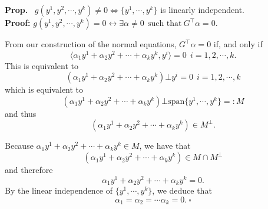 \documentclass[letterpaper]{article}
\begin{document}
%

\newpage

\noindent \textbf{Prop.}~ $g(y^1,y^2,\cdots,y^k) \neq 0 \Leftrightarrow \{ y^1,\cdots, y^k \}$ is linearly independent.\\

\noindent \textbf{Proof:} $g(y^1,y^2,\cdots,y^k) = 0 \leftrightarrow \exists \alpha \neq 0~~\text{such that}~ G^\top \alpha =0$.

From our construction of the normal equations,  $G^\top \alpha = 0$ if, and only if
$$  \langle \alpha_1 y^1+ \alpha_2 y^2+\cdots +\alpha_k y^k, y^i \rangle  = 0     ~~   i=1,2,\cdots ,k.$$
This is equivalent to
$$  \left( \alpha_1 y^1+ \alpha_2 y^2+ \cdots +\alpha_k y^k \right) \bot  y^i = 0     ~~   i=1,2,\cdots ,k$$
which is equivalent to
$$  \left( \alpha_1 y^1+ \alpha_2 y^2+ \cdots + \alpha_k y^k \right) \bot  \textrm{span} \{ y^1, \cdots, y^k \}=:M $$
and thus
$$\left( \alpha_1 y^1+ \alpha_2 y^2+ \cdots + \alpha_k y^k \right) \in M^\perp.$$

Because $\alpha_1 y^1+ \alpha_2 y^2+\cdots +\alpha_k y^k \in M$, we have that
$$\left( \alpha_1 y^1+ \alpha_2 y^2+\cdots +\alpha_k y^k  \right) \in M \cap M^\perp $$
and therefore
$$  \alpha_1 y^1+ \alpha_2 y^2+\cdots +\alpha_k y^k  = 0. $$ By the linear independence of
$\{ y^1,\cdots, y^k \}$, we deduce that $$\alpha_1 = \alpha_2 = \cdots \alpha_k = 0.\ \square$$
\end{document}
